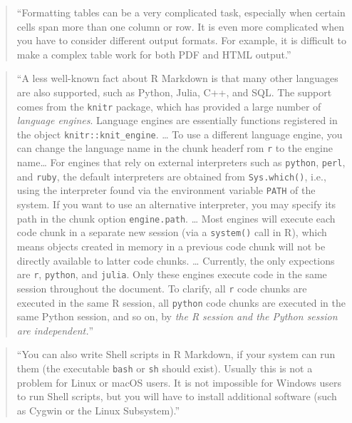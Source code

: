 \documentclass[]{tufte-book}
\begin{document}
\begin{quote}
``Formatting tables can be a very complicated task, especially when certain
cells span more than one column or row. It is even more complicated when you
have to consider different output formats. For example, it is difficult to make
a complex table work for both PDF and HTML output.'' \citep{xie2018r}
\end{quote}

\begin{quote}
``A less well-known fact about R Markdown is that many other languages are also
supported, such as Python, Julia, C++, and SQL. The support comes from the
\texttt{knitr} package, which has provided a large number of \emph{language engines}.
Language engines are essentially functions registered in the object
\texttt{knitr::knit\_engine}. \ldots{} To use a different language engine, you can change the
language name in the chunk headerf rom \texttt{r} to the engine name\ldots{} For engines
that rely on external interpreters such as \texttt{python}, \texttt{perl}, and \texttt{ruby}, the
default interpreters are obtained from \texttt{Sys.which()}, i.e., using the
interpreter found via the environment variable \texttt{PATH} of the system. If you want
to use an alternative interpreter, you may specify its path in the chunk option
\texttt{engine.path}. \ldots{} Most engines will execute each code chunk in a separate new
session (via a \texttt{system()} call in R), which means objects created in memory in a
previous code chunk will not be directly available to latter code chunks. \ldots{}
Currently, the only expections are \texttt{r}, \texttt{python}, and \texttt{julia}. Only these
engines execute code in the same session throughout the document. To clarify,
all \texttt{r} code chunks are executed in the same R session, all \texttt{python} code chunks
are executed in the same Python session, and so on, by \emph{the R session and the
Python session are independent.}'' \citep{xie2018r}
\end{quote}

\begin{quote}
``You can also write Shell scripts in R Markdown, if your system can run them
(the executable \texttt{bash} or \texttt{sh} should exist). Usually this is not a problem for
Linux or macOS users. It is not impossible for Windows users to run Shell scripts, but you will have to install additional software (such as Cygwin or the Linux Subsystem).'' \citep{xie2018r}
\end{quote}
\end{document}
